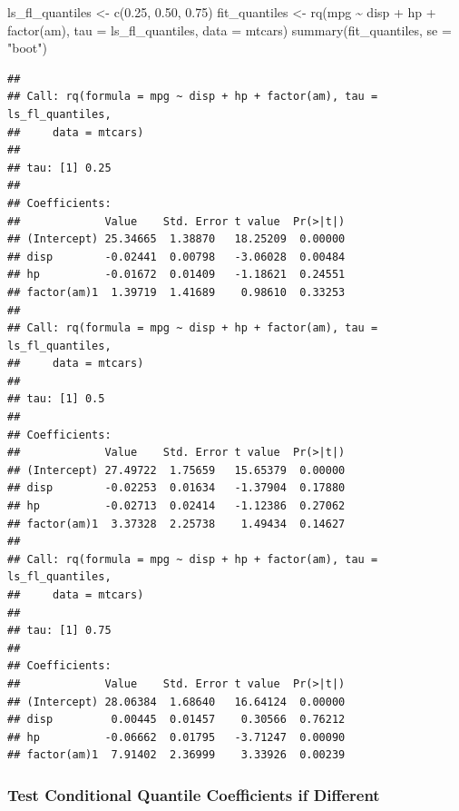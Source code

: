\documentclass[
]{book}
\newenvironment{Shaded}{\begin{snugshade}}{\end{snugshade}}
\newcommand{\AttributeTok}[1]{\textcolor[rgb]{0.77,0.63,0.00}{#1}}
\newcommand{\FloatTok}[1]{\textcolor[rgb]{0.00,0.00,0.81}{#1}}
\newcommand{\FunctionTok}[1]{\textcolor[rgb]{0.00,0.00,0.00}{#1}}
\newcommand{\NormalTok}[1]{#1}
\newcommand{\OtherTok}[1]{\textcolor[rgb]{0.56,0.35,0.01}{#1}}
\newcommand{\SpecialCharTok}[1]{\textcolor[rgb]{0.00,0.00,0.00}{#1}}
\newcommand{\StringTok}[1]{\textcolor[rgb]{0.31,0.60,0.02}{#1}}
\begin{document}
\begin{Shaded}
\begin{Highlighting}[]
\NormalTok{ls\_fl\_quantiles }\OtherTok{\textless{}{-}} \FunctionTok{c}\NormalTok{(}\FloatTok{0.25}\NormalTok{, }\FloatTok{0.50}\NormalTok{, }\FloatTok{0.75}\NormalTok{)}
\NormalTok{fit\_quantiles }\OtherTok{\textless{}{-}} \FunctionTok{rq}\NormalTok{(mpg }\SpecialCharTok{\textasciitilde{}}\NormalTok{ disp }\SpecialCharTok{+}\NormalTok{ hp }\SpecialCharTok{+} \FunctionTok{factor}\NormalTok{(am),}
               \AttributeTok{tau =}\NormalTok{ ls\_fl\_quantiles,}
               \AttributeTok{data =}\NormalTok{ mtcars)}
\FunctionTok{summary}\NormalTok{(fit\_quantiles, }\AttributeTok{se =} \StringTok{"boot"}\NormalTok{)}
\end{Highlighting}
\end{Shaded}

\begin{verbatim}
## 
## Call: rq(formula = mpg ~ disp + hp + factor(am), tau = ls_fl_quantiles, 
##     data = mtcars)
## 
## tau: [1] 0.25
## 
## Coefficients:
##             Value    Std. Error t value  Pr(>|t|)
## (Intercept) 25.34665  1.38870   18.25209  0.00000
## disp        -0.02441  0.00798   -3.06028  0.00484
## hp          -0.01672  0.01409   -1.18621  0.24551
## factor(am)1  1.39719  1.41689    0.98610  0.33253
## 
## Call: rq(formula = mpg ~ disp + hp + factor(am), tau = ls_fl_quantiles, 
##     data = mtcars)
## 
## tau: [1] 0.5
## 
## Coefficients:
##             Value    Std. Error t value  Pr(>|t|)
## (Intercept) 27.49722  1.75659   15.65379  0.00000
## disp        -0.02253  0.01634   -1.37904  0.17880
## hp          -0.02713  0.02414   -1.12386  0.27062
## factor(am)1  3.37328  2.25738    1.49434  0.14627
## 
## Call: rq(formula = mpg ~ disp + hp + factor(am), tau = ls_fl_quantiles, 
##     data = mtcars)
## 
## tau: [1] 0.75
## 
## Coefficients:
##             Value    Std. Error t value  Pr(>|t|)
## (Intercept) 28.06384  1.68640   16.64124  0.00000
## disp         0.00445  0.01457    0.30566  0.76212
## hp          -0.06662  0.01795   -3.71247  0.00090
## factor(am)1  7.91402  2.36999    3.33926  0.00239
\end{verbatim}

\hypertarget{test-conditional-quantile-coefficients-if-different}{%
\subsubsection{Test Conditional Quantile Coefficients if Different}\label{test-conditional-quantile-coefficients-if-different}}
\end{document}
